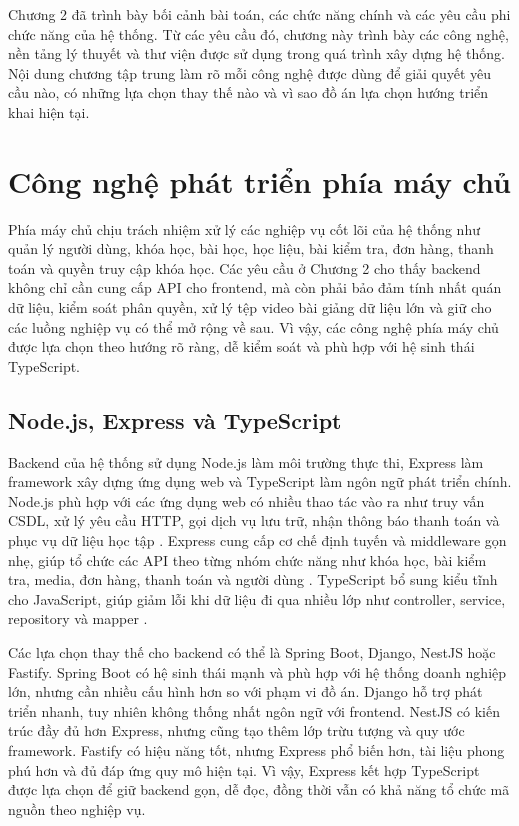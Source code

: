 \documentclass[../DoAn.tex]{subfiles}
\begin{document}
Chương 2 đã trình bày bối cảnh bài toán, các chức năng chính và các yêu cầu phi chức năng của hệ thống. Từ các yêu cầu đó, chương này trình bày các công nghệ, nền tảng lý thuyết và thư viện được sử dụng trong quá trình xây dựng hệ thống. Nội dung chương tập trung làm rõ mỗi công nghệ được dùng để giải quyết yêu cầu nào, có những lựa chọn thay thế nào và vì sao đồ án lựa chọn hướng triển khai hiện tại.

\section{Công nghệ phát triển phía máy chủ}
\label{section:3.1}

Phía máy chủ chịu trách nhiệm xử lý các nghiệp vụ cốt lõi của hệ thống như quản lý người dùng, khóa học, bài học, học liệu, bài kiểm tra, đơn hàng, thanh toán và quyền truy cập khóa học. Các yêu cầu ở Chương 2 cho thấy backend không chỉ cần cung cấp API cho frontend, mà còn phải bảo đảm tính nhất quán dữ liệu, kiểm soát phân quyền, xử lý tệp video bài giảng dữ liệu lớn và giữ cho các luồng nghiệp vụ có thể mở rộng về sau. Vì vậy, các công nghệ phía máy chủ được lựa chọn theo hướng rõ ràng, dễ kiểm soát và phù hợp với hệ sinh thái TypeScript.

\subsection{Node.js, Express và TypeScript}
\label{subsection:3.1.1}

Backend của hệ thống sử dụng Node.js làm môi trường thực thi, Express làm framework xây dựng ứng dụng web và TypeScript làm ngôn ngữ phát triển chính. Node.js phù hợp với các ứng dụng web có nhiều thao tác vào ra như truy vấn CSDL, xử lý yêu cầu HTTP, gọi dịch vụ lưu trữ, nhận thông báo thanh toán và phục vụ dữ liệu học tập \cite{nodejs_docs}. Express cung cấp cơ chế định tuyến và middleware gọn nhẹ, giúp tổ chức các API theo từng nhóm chức năng như khóa học, bài kiểm tra, media, đơn hàng, thanh toán và người dùng \cite{express_docs}. TypeScript bổ sung kiểu tĩnh cho JavaScript, giúp giảm lỗi khi dữ liệu đi qua nhiều lớp như controller, service, repository và mapper \cite{typescript_docs}.

Các lựa chọn thay thế cho backend có thể là Spring Boot, Django, NestJS hoặc Fastify. Spring Boot có hệ sinh thái mạnh và phù hợp với hệ thống doanh nghiệp lớn, nhưng cần nhiều cấu hình hơn so với phạm vi đồ án. Django hỗ trợ phát triển nhanh, tuy nhiên không thống nhất ngôn ngữ với frontend. NestJS có kiến trúc đầy đủ hơn Express, nhưng cũng tạo thêm lớp trừu tượng và quy ước framework. Fastify có hiệu năng tốt, nhưng Express phổ biến hơn, tài liệu phong phú hơn và đủ đáp ứng quy mô hiện tại. Vì vậy, Express kết hợp TypeScript được lựa chọn để giữ backend gọn, dễ đọc, đồng thời vẫn có khả năng tổ chức mã nguồn theo nghiệp vụ.
\end{document}
